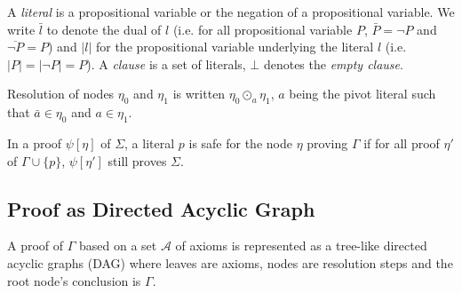 \documentclass{llncs}
\newcommand{\dual}[1]{\ensuremath{\bar{#1}}}
\begin{document}
A \emph{literal} is a propositional variable or the negation of a propositional variable. We write
\dual{l} to denote the dual of $l$ (i.e. for all propositional variable $P$, $\dual{P} =
\neg P$ and $\overline{\neg P} = P$) and $|l|$ for the propositional variable underlying the literal
$l$ (i.e. $|P| = |\neg P| = P$). A \emph{clause} is a set of literals, $\bot$ denotes the
\emph{empty clause}.

\begin{notation}[Resolution]
Resolution of nodes $\eta_0$ and $\eta_1$ is written $\eta_0 \odot_a \eta_1$, $a$ being the pivot
literal such that $\bar{a} \in \eta_0$ and $a \in \eta_1$.
\end{notation}

\begin{definition}
In a proof $\psi[\eta]$ of $\Sigma$, a literal $p$ is safe for the node $\eta$ proving $\Gamma$ if
for all proof $\eta'$ of $\Gamma \cup \{p\}$, $\psi[\eta']$ still proves $\Sigma$.
\end{definition}

\subsection{Proof as Directed Acyclic Graph}

A proof of $\Gamma$ based on a set $\mathcal{A}$ of axioms is represented as a tree-like directed
acyclic graphs (DAG) where leaves are axioms, nodes are resolution steps and the root node's
conclusion is $\Gamma$.
\end{document}
